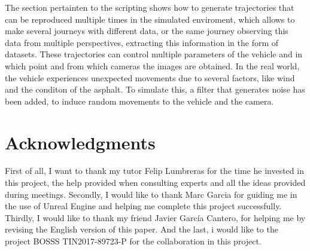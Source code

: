 \documentclass[10pt,a4paper,twocolumn,twoside]{article}
\begin{document}
The section pertainten to the scripting shows how to generate trajectories that can be reproduced multiple times in the simulated enviroment, which allows to make several journeys with different data, or the same journey observing this data from multiple perspectives, extracting this information in the form of datasets. These trajectories can control multiple parameters of the vehicle and in which point and from which cameras the images are obtained. In the real world, the vehicle experiences unexpected movements due to several factors, like wind and the conditon of the asphalt. To simulate this, a filter that generates noise has been added, to induce random movements to the vehicle and the camera.

\section*{Acknowledgments}

First of all, I want to thank  my tutor Felip Lumbreras for the time he invested in this project, the help provided when consulting experts and all the ideas provided during meetings. Secondly, I would like to thank Marc Garcia for guiding me in the use of Unreal Engine and helping me complete this project successfully. Thirdly, I would like to thank my friend Javier García Cantero, for helping me by revising the English version of this paper. And the last, i would like to the project BOSSS TIN2017-89723-P for the collaboration in this project.
\end{document}
